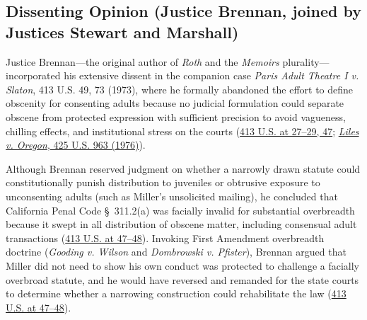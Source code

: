 \documentclass[12pt]{article}
\begin{document}
\subsection{Dissenting Opinion (Justice Brennan, joined by Justices Stewart and Marshall)}
Justice Brennan---the original author of \textit{Roth} and the \textit{Memoirs} plurality---incorporated his extensive dissent in the companion case \textit{Paris Adult Theatre I v. Slaton}, 413 U.S. 49, 73 (1973), where he formally abandoned the effort to define obscenity for consenting adults because no judicial formulation could separate obscene from protected expression with sufficient precision to avoid vagueness, chilling effects, and institutional stress on the courts (\href{https://supreme.justia.com/cases/federal/us/413/15/}{413 U.S. at 27--29, 47}; \href{https://caselaw.findlaw.com/court/us-supreme-court/425/963.html}{\textit{Liles v. Oregon}, 425 U.S. 963 (1976)}).

Although Brennan reserved judgment on whether a narrowly drawn statute could constitutionally punish distribution to juveniles or obtrusive exposure to unconsenting adults (such as Miller's unsolicited mailing), he concluded that California Penal Code \S~311.2(a) was facially invalid for substantial overbreadth because it swept in all distribution of obscene matter, including consensual adult transactions (\href{https://supreme.justia.com/cases/federal/us/413/15/}{413 U.S. at 47--48}). Invoking First Amendment overbreadth doctrine (\textit{Gooding v. Wilson} and \textit{Dombrowski v. Pfister}), Brennan argued that Miller did not need to show his own conduct was protected to challenge a facially overbroad statute, and he would have reversed and remanded for the state courts to determine whether a narrowing construction could rehabilitate the law (\href{https://supreme.justia.com/cases/federal/us/413/15/}{413 U.S. at 47--48}).
\end{document}
